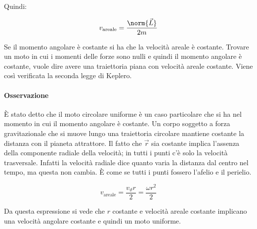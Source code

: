 Quindi:

\[
	v_\text{areale}=\frac{\norm{\vec{L}}}{2m}
\]

Se il momento angolare è costante si ha che la velocità areale è costante. Trovare un moto in cui i momenti delle forze sono nulli e quindi il momento angolare è costante, vuole dire avere una traiettoria piana con velocità areale costante. Viene così verificata la seconda legge di Keplero.

\paragraph{Osservazione} È stato detto che il moto circolare uniforme è un caso particolare che si ha nel momento in cui il momento angolare è costante. Un corpo soggetto a forza gravitazionale che si muove lungo una traiettoria circolare mantiene costante la distanza con il pianeta attrattore. Il fatto che $\vec{r}$ sia costante implica l'assenza della componente radiale della velocità; in tutti i punti c'è solo la velocità trasversale. Infatti la velocità radiale dice quanto varia la distanza dal centro nel tempo, ma questa non cambia. È come se tutti i punti fossero l'afelio e il perielio.

\[
	v_\text{areale}=\frac{v_\vartheta r}{2}=\frac{\omega r^2}{2}
\]

Da questa espressione si vede che $r$ costante e velocità areale costante implicano una velocità angolare costante e quindi un moto uniforme.

